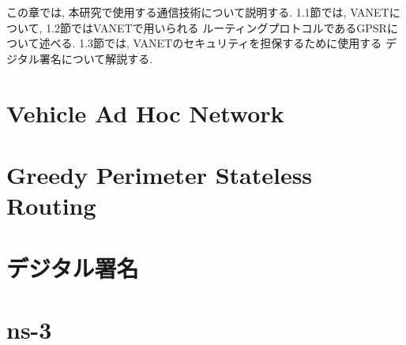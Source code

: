 この章では, 本研究で使用する通信技術について説明する. 
1.1節では, VANETについて, 1.2節ではVANETで用いられる
ルーティングプロトコルであるGPSRについて述べる. 
1.3節では, VANETのセキュリティを担保するために使用する
デジタル署名について解説する.

\section{Vehicle Ad Hoc Network}

\section{Greedy Perimeter Stateless Routing}

\section{デジタル署名}

\section{ns-3}

